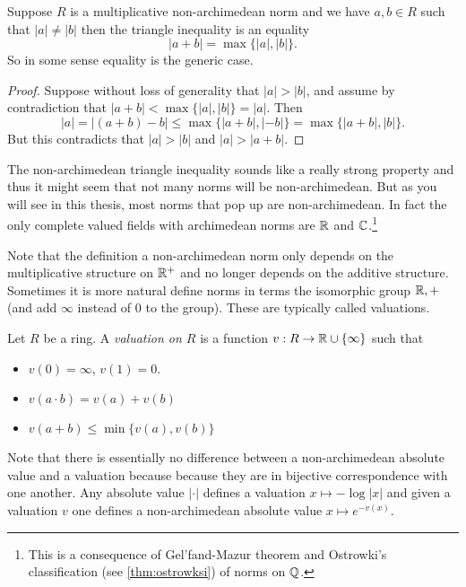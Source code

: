 \begin{remark}
	Suppose $R$ is a multiplicative non-archimedean norm and we have $a, b \in R$ such that $|a| \ne |b|$ then the triangle inequality is an equality \[
	|a + b| = \max \{|a|, |b|\} 
	.\] 
	So in some sense equality is the generic case. 
\end{remark}
\begin{proof}
	Suppose without loss of generality that  $|a| > |b|$, and assume by contradiction that $|a + b| < \max \{|a|, |b|\}  = |a|$. 
	Then \[
		|a| = |(a + b) - b| \le \max \{|a + b|, |- b|\} = \max \{|a + b|, |b|\}  
	.\] 
	But this contradicts that $|a| > |b|$ and $|a| > |a + b| $. 
\end{proof}
The non-archimedean triangle inequality sounds like a really strong property and thus it might seem that not many norms will be non-archimedean. 
But as you will see in this thesis, most norms that pop up are non-archimedean. 
In fact the only complete valued fields with archimedean norms are $\mathbb{R}$ and $\mathbb{C}$.\footnote{This is a consequence of Gel'fand-Mazur theorem and Ostrowki's classification (see \cref{thm:ostrowksi}) of norms on $\mathbb{Q}$.}



Note that the definition a non-archimedean norm only depends on the multiplicative structure on $\mathbb{R}^{+}$ and no longer depends on the additive structure. 
Sometimes it is more natural define norms in terms the isomorphic group $\mathbb{R}, +$ (and add $\infty$ instead of $0$ to the group). 
These are typically called valuations. 


\begin{definition}
	Let $R$ be a ring. A \emph{valuation on $R$} is a function $v:R \to \mathbb{R} \cup \{\infty\} $ such that 	
	\begin{itemize}
		\item $v(0) = \infty$, $v(1) = 0$. 
		\item $v(a\cdot b) = v(a) + v(b)$
		\item $v(a + b) \le \min\{v(a), v(b)\}$
	\end{itemize}
\end{definition}

\begin{remark}
	Note that there is essentially no difference between a non-archimedean absolute value and a valuation because because they are in bijective correspondence with one another.  Any absolute value $|\cdot |$ defines a valuation $x \mapsto -\log |x|$ and given a valuation $v$ one defines a non-archimedean absolute value $x\mapsto e^{- v(x)}$. 
\end{remark}





